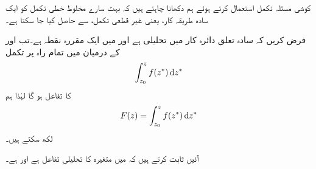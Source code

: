 کوشی مسئلہ تکمل استعمال کرتے ہوئے ہم دکھانا چاہتے ہیں کہ بہت سارے مخلوط خطی تکمل کو ایک سادہ طریقہ کار، یعنی غیر قطعی تکمل،  سے حاصل کیا جا سکتا ہے۔

فرض کریں کہ سادہ تعلق دائرہ کار  میں  تحلیلی ہے اور  میں  ایک مقررہ نقطہ ہے۔تب  اور  کے درمیان   میں تمام راہ پر تکمل 
\begin{align*}
\int_{z_0}^z f(z^*)\dif z^*
\end{align*}
 کا تفاعل ہو گا لہٰذا ہم 
\begin{align}\label{مساوات_مخلوط_تکمل_بذریعہ_غیر_قطعی_تکمل_الف}
F(z)=\int_{z_0}^z f(z^*)\dif z^*
\end{align}
لکھ سکتے ہیں۔

آئیں ثابت کرتے ہیں کہ  میں  متغیرہ  کا تحلیلی تفاعل ہے اور  ہے۔

